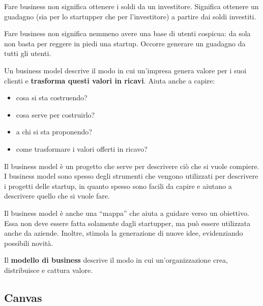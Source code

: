 Fare business non significa ottenere i soldi da un investitore. Significa
ottenere un guadagno (sia per lo startupper che per l'investitore) a partire
dai soldi investiti.

Fare business non significa nemmeno avere una base di utenti cospicua: da
sola non basta per reggere in piedi una startup. Occorre generare un guadagno
da tutti gli utenti.

Un business model descrive il modo in cui un'impresa genera valore per i suoi
clienti e \textbf{trasforma questi valori in ricavi}. Aiuta anche a capire:

\begin{itemize}

\item cosa si sta costruendo?

\item cosa serve per costruirlo?

\item a chi si sta proponendo?

\item come trasformare i valori offerti in ricavo?

\end{itemize}

Il business model è un progetto che serve per descrivere ciò che si vuole
compiere. I business model sono spesso degli strumenti che vengono utilizzati
per descrivere i progetti delle startup, in quanto spesso sono facili da capire
e aiutano a descrivere quello che si vuole fare.

Il business model è anche una ``mappa'' che aiuta a guidare verso un obiettivo.
Essa non deve essere fatta solamente dagli startupper, ma può essere utilizzata
anche da aziende. Inoltre, stimola la generazione di nuove idee, evidenziando
possibili novità.

\begin{definition}
Il \textbf{modello di business} descrive il modo in cui un'organizzazione crea,
distribuisce e cattura valore.
\end{definition}

\subsection{Canvas}

